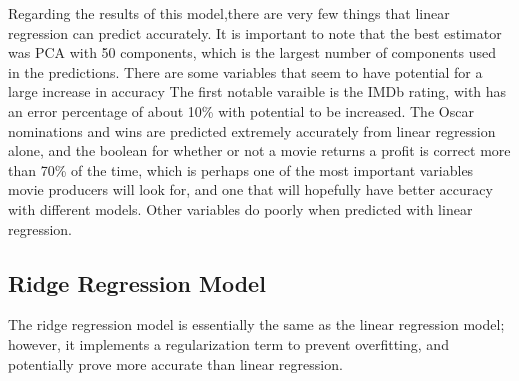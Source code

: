 \documentclass[11pt]{article}
\begin{document}
Regarding the results of this model,there are very few things that linear regression can predict accurately. It is important to note that the best estimator was PCA with 50 components, which is the largest number of components used in the predictions. There are some variables that seem to have potential for a large increase in accuracy The first notable varaible is the IMDb rating, with has an error percentage of about 10\% with potential to be increased. The Oscar nominations and wins are predicted extremely accurately from linear regression alone, and the boolean for whether or not a movie returns a profit is correct more than 70\% of the time, which is perhaps one of the most important variables movie producers will look for, and one that will hopefully have better accuracy with different models. Other variables do poorly when predicted with linear regression.

\hypertarget{linear-regression-model-analysis}{%
	\subsection{Ridge Regression Model
		}\label{ridge-regression-model-}}
	
The ridge regression model is essentially the same as the linear regression model; however, it implements a regularization term to prevent overfitting, and potentially prove more accurate than linear regression.
	


%
%
%
\end{document}
